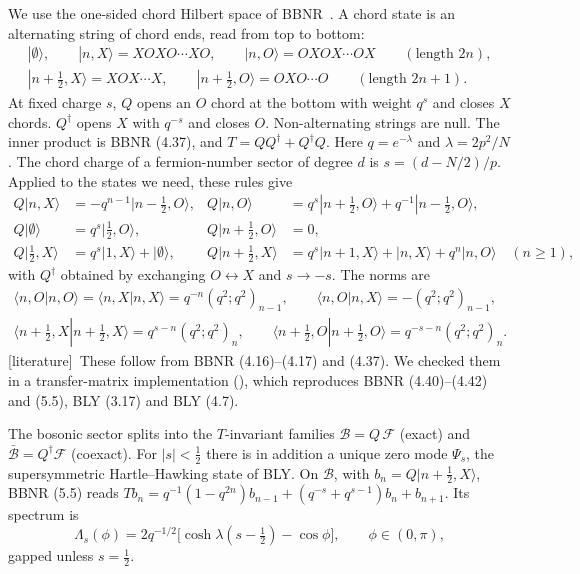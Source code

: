 \documentclass[11pt]{article}
\newcommand{\tagbox}[2]{\textsf{\small\color{#1}[#2]}}
\newcommand{\EST}{\tagbox{cest}{literature}}
\theoremstyle{plain}
\theoremstyle{remark}
\numberwithin{equation}{section}
\begin{document}
We use the one-sided chord Hilbert space of BBNR~\cite[\S\S4.4--5.1]{BBNR}. A chord state is an alternating string of
chord ends, read from top to bottom:
\begin{gather*}
|\emptyset\rangle,\qquad |n,X\rangle=XOXO\cdots XO,\qquad |n,O\rangle=OXOX\cdots OX\qquad(\text{length }2n),\\
|n{+}\tfrac12,X\rangle=XOX\cdots X,\qquad |n{+}\tfrac12,O\rangle=OXO\cdots O\qquad(\text{length }2n+1).
\end{gather*}
At fixed charge $s$, $Q$ opens an $O$ chord at the bottom with weight $q^{s}$ and closes $X$ chords. $Q^\dagger$ opens
$X$ with $q^{-s}$ and closes $O$. Non-alternating strings are null. The inner product is BBNR (4.37), and $T=QQ^\dagger+Q^\dagger Q$.
Here $q=e^{-\lambda}$ and $\lambda=2p^2/N$. The chord charge of a fermion-number sector of degree $d$ is $s=(d-N/2)/p$.
Applied to the states we need, these rules give
\begin{align}
Q|n,X\rangle&=-q^{n-1}|n{-}\tfrac12,O\rangle, & Q|n,O\rangle&=q^{s}|n{+}\tfrac12,O\rangle+q^{-1}|n{-}\tfrac12,O\rangle,\label{eq:Qrules}\\
Q|\emptyset\rangle&=q^{s}|\tfrac12,O\rangle, & Q|n{+}\tfrac12,O\rangle&=0,\nonumber\\
Q|\tfrac12,X\rangle&=q^s|1,X\rangle+|\emptyset\rangle, & Q|n{+}\tfrac12,X\rangle&=q^{s}|n{+}1,X\rangle+|n,X\rangle+q^{n}|n,O\rangle\quad(n\ge1),\nonumber
\end{align}
with $Q^\dagger$ obtained by exchanging $O\leftrightarrow X$ and $s\to-s$. The norms are
\begin{gather}
\langle n,O|n,O\rangle=\langle n,X|n,X\rangle=q^{-n}(q^2;q^2)_{n-1},\qquad \langle n,O|n,X\rangle=-(q^2;q^2)_{n-1},\label{eq:gram}\\
\langle n{+}\tfrac12,X|n{+}\tfrac12,X\rangle=q^{s-n}(q^2;q^2)_n,\qquad \langle n{+}\tfrac12,O|n{+}\tfrac12,O\rangle=q^{-s-n}(q^2;q^2)_n .\nonumber
\end{gather}
\EST\ These follow from BBNR (4.16)--(4.17) and (4.37). We checked them in a transfer-matrix implementation
(), which reproduces BBNR (4.40)--(4.42) and (5.5), BLY (3.17) and BLY (4.7).

The bosonic sector splits into the $T$-invariant families $\mathcal B=Q\,\mathcal F$ (exact) and
$\bar{\mathcal B}=Q^\dagger\mathcal F$ (coexact). For $|s|<\tfrac12$ there is in addition a unique zero mode $\Psi_s$, the
supersymmetric Hartle--Hawking state of BLY. On $\mathcal B$, with $b_n=Q|n{+}\tfrac12,X\rangle$, BBNR (5.5) reads
$Tb_n=q^{-1}(1-q^{2n})b_{n-1}+(q^{-s}+q^{s-1})b_n+b_{n+1}$. Its spectrum is
\begin{equation}\label{eq:Lambda}
\Lambda_s(\phi)=2q^{-1/2}\big[\cosh\lambda(s-\tfrac12)-\cos\phi\big],\qquad \phi\in(0,\pi),
\end{equation}
gapped unless $s=\tfrac12$.
\end{document}
